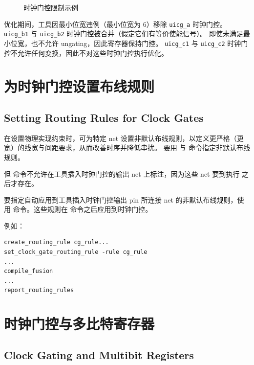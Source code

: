 \begin{figure}[htbp]
\centering
{}
\caption{时钟门控限制示例}
\label{fig:cg-xform-ex}
\end{figure}

优化期间，工具因最小位宽违例（最小位宽为 6）移除 \texttt{uicg\_a} 时钟门控。
\texttt{uicg\_b1} 与 \texttt{uicg\_b2} 时钟门控被合并（假定它们有等价使能信号）。
即使未满足最小位宽，也不允许 ungating，因此寄存器保持门控。
\texttt{uicg\_c1} 与 \texttt{uicg\_c2} 时钟门控不允许任何变换，因此不对这些时钟门控执行优化。

\section{为时钟门控设置布线规则}
\subsection*{Setting Routing Rules for Clock Gates}

在设置物理实现约束时，可为特定 net 设置非默认布线规则，以定义更严格（更宽）的线宽与间距要求，从而改善时序并降低串扰。
要用  与  命令指定非默认布线规则。

但  命令不允许在工具插入时钟门控的输出 net 上标注，因为这些 net 要到执行  之后才存在。

要指定自动应用到工具插入时钟门控输出 pin 所连接 net 的非默认布线规则，使用  命令。这些规则在  命令之后应用到时钟门控。

例如：
\begin{lstlisting}
create_routing_rule cg_rule...
set_clock_gate_routing_rule -rule cg_rule
...
compile_fusion
...
report_routing_rules
\end{lstlisting}

\section{时钟门控与多比特寄存器}
\subsection*{Clock Gating and Multibit Registers}

